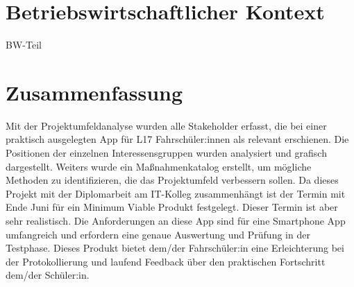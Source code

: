 \chapter{Betriebswirtschaftlicher Kontext}
BW-Teil

\chapter{Zusammenfassung}
Mit der Projektumfeldanalyse wurden alle Stakeholder erfasst, die bei einer praktisch ausgelegten App für L17 Fahrschüler:innen als relevant erschienen. Die Positionen der einzelnen Interessensgruppen wurden analysiert und grafisch dargestellt. Weiters wurde ein Maßnahmenkatalog erstellt, um mögliche Methoden zu identifizieren, die das Projektumfeld verbessern sollen. Da dieses Projekt mit der Diplomarbeit am IT-Kolleg zusammenhängt ist der Termin mit Ende Juni für ein Minimum Viable Produkt festgelegt. Dieser Termin ist aber sehr realistisch. Die Anforderungen an diese App sind für eine Smartphone App umfangreich und erfordern eine genaue Auswertung und Prüfung in der Testphase. Dieses Produkt bietet dem/der Fahrschüler:in eine Erleichterung bei der Protokollierung und laufend Feedback über den praktischen Fortschritt dem/der Schüler:in.